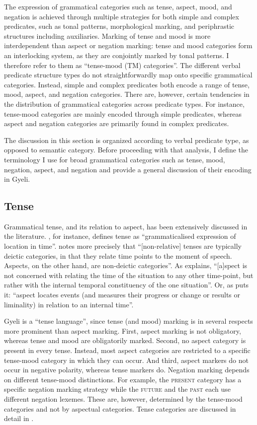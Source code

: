 The expression of grammatical categories such as tense, aspect, mood, and negation is achieved through multiple strategies for both  simple and complex predicates, such as tonal patterns, morphological marking, and periphrastic structures including auxiliaries.  Marking of tense and mood is more interdependent than aspect or negation marking: tense and mood categories form an interlocking system, as they are conjointly marked by tonal patterns. I therefore refer to them as ``tense-mood (TM) categories''.   
The different verbal predicate structure types do not straightforwardly map onto specific grammatical categories. Instead, simple and complex predicates both encode a range of tense, mood, aspect, and negation categories. There are, however, certain tendencies in the distribution of grammatical categories across predicate types. For instance,  tense-mood categories are mainly encoded through simple predicates, whereas aspect and negation categories are primarily found in complex predicates. 

The discussion in this section is organized according to  verbal predicate type, as opposed to  semantic category. Before proceeding with that analysis, I define the terminology I use for broad grammatical categories such as tense, mood, negation, aspect, and negation and provide a general discussion of their encoding in Gyeli. 


\subsection*{Tense}
Grammatical tense, and its relation to aspect, has been extensively discussed in the literature.
\citet[9]{comrie85}, for instance, defines tense as ``grammaticalised expression of location in time''.  \citet[25]{dahl85} notes more precisely that ``[non-relative] tenses are typically deictic categories, in that they relate time points to the moment of speech. Aspects, on the other hand, are non-deictic categories''.  As \citet[5]{comrie76} explains, ``[a]spect is not concerned with relating the time of the situation to any other time-point, but rather with the internal temporal constituency of the one situation''. Or, as \citet[315]{timberlake2007} puts it: ``aspect locates events (and measures their progress or change or results or liminality) in relation to an internal time''. 

Gyeli is  a ``tense language'', since tense (and mood) marking is in several respects more prominent than aspect marking. First, aspect marking is not obligatory, whereas tense and mood are obligatorily marked. Second, no aspect category is present in  every tense. Instead, most aspect categories are restricted to a specific tense-mood category in which they can occur. And third, aspect markers do not occur in negative polarity, whereas tense markers do. Negation marking depends on different tense-mood distinctions. For example, the \textsc{present} category has a specific negation marking strategy while the \textsc{future} and the \textsc{past} each use different negation lexemes. These are, however, determined by the tense-mood categories and not by aspectual categories. Tense categories are discussed in detail in .


